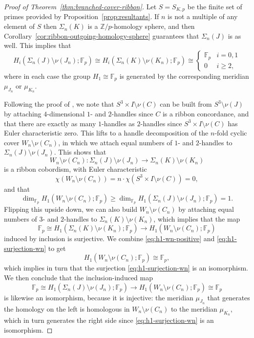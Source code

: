 \documentclass[11pt]{amsart}
\numberwithin{equation}{section}
\numberwithin{theorem}{section}
\theoremstyle{definition}
\newcommand{\Z}{\mathbb{Z}}
\newcommand{\F}{\mathbb{F}}
\begin{document}
\begin{proof}[Proof of Theorem~\ref{thm:branched-cover-ribbon}]
Let $S = S_{K,p}$ be the finite set of primes provided by Proposition~\ref{prop:resultants}.  If $n$ is not a multiple of any element of $S$ then $\Sigma_n(K)$ is a $\Z/p$-homology sphere, and then Corollary~\ref{cor:ribbon-outgoing-homology-sphere} guarantees that $\Sigma_n(J)$ is as well.  This implies that
\[ H_i(\Sigma_n(J) \setminus \nu(J_n); \F_p) \cong H_i(\Sigma_n(K) \setminus \nu(K_n); \F_p) \cong
\begin{cases} \F_p & i=0,1 \\ 0 & i \geq 2, \end{cases} \]
where in each case the group $H_1 \cong \F_p$ is generated by the corresponding meridian $\mu_{J_n}$ or $\mu_{K_n}$.

Following the proof of \cite[Lemma 2.2]{bs-ribbon}, we note that $S^3 \times I \setminus \nu(C)$ can be built from $S^3 \setminus \nu(J)$ by attaching $4$-dimensional $1$- and $2$-handles since $C$ is a ribbon concordance, and that there are exactly as many $1$-handles as $2$-handles since $S^3 \times I \setminus \nu(C)$ has Euler characteristic zero.  This lifts to a handle decomposition of the $n$-fold cyclic cover $W_n \setminus \nu(C_n)$, in which we attach equal numbers of $1$- and $2$-handles to $\Sigma_n(J) \setminus \nu(J_n)$.  This shows that \[W_n \setminus \nu(C_n):\Sigma_n(J) \setminus \nu(J_n) \to \Sigma_n(K) \setminus \nu(K_n)\] is a ribbon cobordism, with Euler characteristic
\begin{equation} \label{eq:chi-wn}
\chi(W_n \setminus \nu(C_n)) = n \cdot \chi(S^3 \times I \setminus \nu(C)) = 0,
\end{equation}
and that
\begin{equation} \label{eq:h1-wn-positive}
\dim_{\F_p} H_1(W_n \setminus \nu(C_n); \F_p) \geq \dim_{\F_p} H_1(\Sigma_n(J) \setminus \nu(J_n); \F_p) = 1.
\end{equation}
Flipping this upside down, we can also build $W_n \setminus \nu(C_n)$ by attaching equal numbers of $3$- and $2$-handles to $\Sigma_n(K) \setminus \nu(K_n)$, which implies that the map
\begin{equation} \label{eq:h1-surjection-wn}
\F_p \cong H_1(\Sigma_n(K) \setminus \nu(K_n); \F_p) \to H_1(W_n \setminus \nu(C_n); \F_p)
\end{equation}
induced by inclusion is surjective.  We combine \eqref{eq:h1-wn-positive} and \eqref{eq:h1-surjection-wn} to get
\[ H_1(W_n \setminus \nu(C_n); \F_p) \cong \F_p, \]
which implies in turn that the surjection \eqref{eq:h1-surjection-wn} is an isomorphism.  We then conclude that the inclusion-induced map
\begin{equation} \label{eq:h1-injection-wn}
\F_p \cong H_1(\Sigma_n(J) \setminus \nu(J_n); \F_p) \to H_1(W_n \setminus \nu(C_n); \F_p) \cong \F_p
\end{equation}
is likewise an isomorphism, because it is injective: the meridian $\mu_{J_n}$ that generates the homology on the left is homologous in $W_n \setminus \nu(C_n)$ to the meridian $\mu_{K_n}$, which in turn generates the right side  since \eqref{eq:h1-surjection-wn} is an isomorphism.


\end{proof}
\end{document}
